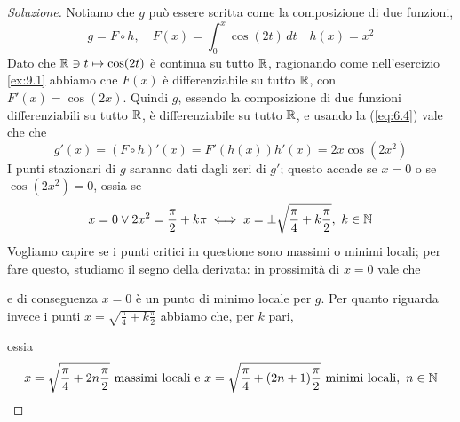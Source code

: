 \begin{proof}[Soluzione]
    Notiamo che $g$ può essere scritta come la composizione di due funzioni,
    \[
    g = F \circ h, \quad F(x) = \int_0^x \cos(2t)\, dt \quad h(x) = x^2
    \]
    Dato che $\amsbb{R}\ni t \mapsto \cos(2t)$ è continua su tutto $\amsbb{R}$, ragionando come nell'esercizio \ref{ex:9.1} abbiamo che $F(x)$ è differenziabile su tutto $\amsbb{R}$, con $F'(x) = \cos(2x)$. Quindi $g$, essendo la composizione di due funzioni differenziabili su tutto $\amsbb{R}$, è differenziabile su tutto $\amsbb{R}$, e usando la (\ref{eq:6.4}) vale che che
    \[
    g'(x) = (F \circ h)'(x) = F'(h(x))h'(x) = 2x\cos(2x^2)
    \]
    I punti stazionari di $g$ saranno dati dagli zeri di $g'$; questo accade se $x=0$ o se $\cos(2x^2)=0$, ossia se
    \[
    x=0 \lor 2x^2 = \frac{\pi}{2}+k\pi \iff x=\pm\sqrt{\frac{\pi}{4}+k\frac{\pi}{2}}, \ k\in\amsbb{N}
    \]
    Vogliamo capire se i punti critici in questione sono massimi o minimi locali; per fare questo, studiamo il segno della derivata: in prossimità di $x=0$ vale che
    \begin{center}
    \end{center}
    e di conseguenza $x=0$ è un punto di minimo locale per $g$. Per quanto riguarda invece i punti $x= \sqrt{\frac{\pi}{4}+k\frac{\pi}{2}}$ abbiamo che, per $k$ pari,
    \begin{center}
    \end{center}
    ossia 
    \[
    x= \sqrt{\frac{\pi}{4}+2n\frac{\pi}{2}} \ \text{massimi locali e} \ x= \sqrt{\frac{\pi}{4}+(2n+1)\frac{\pi}{2}} \ \text{minimi locali},\ n\in\amsbb{N}
\]
\end{proof}
